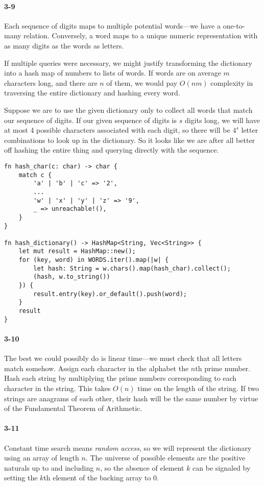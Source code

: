 \documentclass{report}
\begin{document}
\paragraph{3-9} Each sequence of digits maps to multiple potential words---we have a one-to-many relation. Conversely, a word maps to a unique numeric representation with as many digits as the words as letters.

If multiple queries were necessary, we might justify transforming the dictionary into a hash map of numbers to lists of words. If words are on average $m$ characters long, and there are $n$ of them, we would pay $O(nm)$ complexity in traversing the entire dictionary and hashing every word.

Suppose we are to use the given dictionary only to collect all words that match our sequence of digits. If our given sequence of digits is $s$ digits long, we will have at most 4 possible characters associated with each digit, so there will be $4^s$ letter combinations to look up in the dictionary. So it looks like we are after all better off hashing the entire thing and querying directly with the sequence.

\begin{lstlisting}
fn hash_char(c: char) -> char {
    match c {
        'a' | 'b' | 'c' => '2',
        ...
        'w' | 'x' | 'y' | 'z' => '9',
        _ => unreachable!(),
    }
}

fn hash_dictionary() -> HashMap<String, Vec<String>> {
    let mut result = HashMap::new();
    for (key, word) in WORDS.iter().map(|w| {
        let hash: String = w.chars().map(hash_char).collect();
        (hash, w.to_string())
    }) {
        result.entry(key).or_default().push(word);
    }
    result
}
\end{lstlisting}

\paragraph{3-10} The best we could possibly do is linear time---we must check that all letters match somehow. Assign each character in the alphabet the $n$th prime number. Hash each string by multiplying the prime numbers corresponding to each character in the string. This takes $O(n)$ time on the length of the string. If two strings are anagrams of each other, their hash will be the same number by virtue of the Fundamental Theorem of Arithmetic.

\paragraph{3-11} Constant time search means \emph{random access}, so we will represent the dictionary using an array of length $n$. The universe of possible elements are the positive naturals up to and including $n$, so the absence of element $k$ can be signaled by setting the $k$th element of the backing array to 0.
\end{document}
